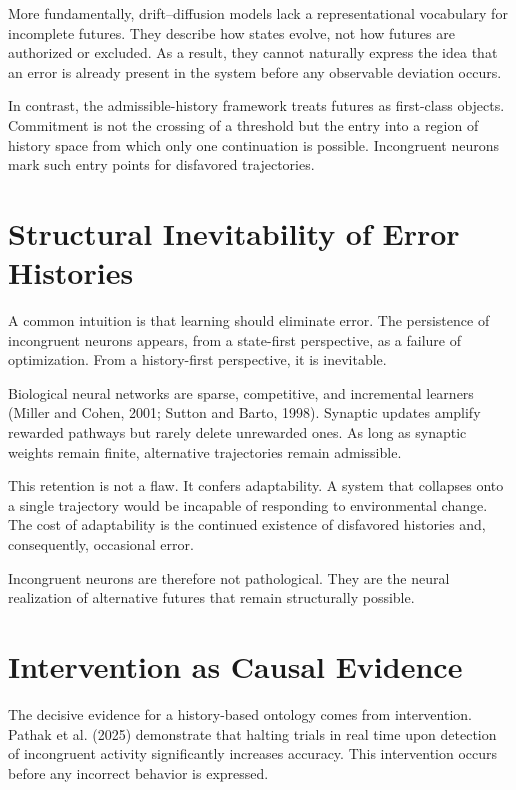 \documentclass[11pt]{article}
\begin{document}
More fundamentally, drift–diffusion models lack a representational vocabulary for incomplete futures. They describe how states evolve, not how futures are authorized or excluded. As a result, they cannot naturally express the idea that an error is already present in the system before any observable deviation occurs.

In contrast, the admissible-history framework treats futures as first-class objects. Commitment is not the crossing of a threshold but the entry into a region of history space from which only one continuation is possible. Incongruent neurons mark such entry points for disfavored trajectories.

\section{Structural Inevitability of Error Histories}

A common intuition is that learning should eliminate error. The persistence of incongruent neurons appears, from a state-first perspective, as a failure of optimization. From a history-first perspective, it is inevitable.

Biological neural networks are sparse, competitive, and incremental learners (Miller and Cohen, 2001; Sutton and Barto, 1998). Synaptic updates amplify rewarded pathways but rarely delete unrewarded ones. As long as synaptic weights remain finite, alternative trajectories remain admissible.

This retention is not a flaw. It confers adaptability. A system that collapses onto a single trajectory would be incapable of responding to environmental change. The cost of adaptability is the continued existence of disfavored histories and, consequently, occasional error.

Incongruent neurons are therefore not pathological. They are the neural realization of alternative futures that remain structurally possible.

\section{Intervention as Causal Evidence}

The decisive evidence for a history-based ontology comes from intervention. Pathak et al. (2025) demonstrate that halting trials in real time upon detection of incongruent activity significantly increases accuracy. This intervention occurs before any incorrect behavior is expressed.
\end{document}
